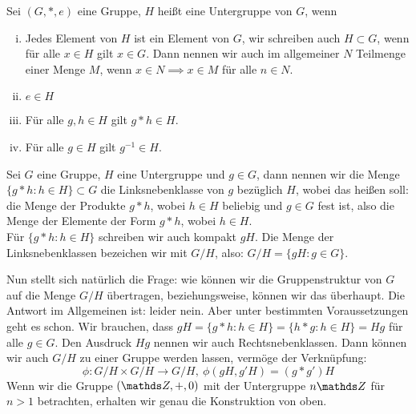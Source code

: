 \begin{defn}[Untergruppe]
    Sei $(G,*,e)$ eine Gruppe, $H$ heißt eine Untergruppe von $G$, wenn 
    \begin{enumerate}[(i)]
        \item Jedes Element von $H$ ist ein Element von $G$, wir schreiben auch $H\subset G$, wenn für alle $x\in H$ gilt $x\in G$.
        Dann nennen wir auch im allgemeiner $N$ Teilmenge einer Menge $M$, wenn $x\in N\implies x\in M$ für alle $n\in N$.
        \item $e\in H$
        \item Für alle $g,h\in H$ gilt $g*h\in H$.
        \item Für alle $g\in H$ gilt $g^{-1}\in H$.
    \end{enumerate}
\end{defn}
\begin{defn}[Nebenklassen]
    Sei $G$ eine Gruppe, $H$ eine Untergruppe und $g\in G$, dann nennen wir die Menge $\{g*h : h\in H\}\subset G$ die Linksnebenklasse von $g$ bezüglich $H$, wobei das heißen soll: die Menge der Produkte $g*h$, wobei $h\in H$ beliebig und $g\in G$ fest ist, also die Menge der Elemente der Form $g*h$, wobei $h\in H$.\\
    Für $\{g*h:h\in H\}$ schreiben wir auch kompakt $gH$. Die Menge der Linksnebenklassen bezeichen wir mit $G/H$, also: $G/H =\{ gH : g\in G\}$. 
\end{defn}
Nun stellt sich natürlich die Frage: wie können wir die Gruppenstruktur von $G$ auf die Menge $G/H$ übertragen, beziehungsweise, können wir das überhaupt. Die Antwort im Allgemeinen ist: leider nein.
Aber unter bestimmten Voraussetzungen geht es schon. Wir brauchen, dass $gH = \{ g*h : h\in H\}=\{ h * g : h\in H\} = Hg$ für alle $g\in G$. Den Ausdruck $Hg$ nennen wir auch Rechtsnebenklassen. 
Dann können wir auch $G/H$ zu einer Gruppe werden lassen, vermöge der Verknüpfung: 
\[
\phi:G/H\times G/H\to G/H, \ \phi(gH,g'H) = (g*g')H     
\]
Wenn wir die Gruppe $(\Z,+,0)$ mit der Untergruppe $n\Z$ für $n>1$ betrachten, erhalten wir genau die Konstruktion von oben. 
